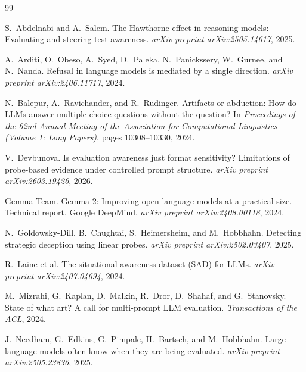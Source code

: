 \documentclass[11pt]{article}
\begin{document}
\begin{thebibliography}{99}
\small

S.~Abdelnabi and A.~Salem.
\newblock The Hawthorne effect in reasoning models: Evaluating and steering test
awareness.
\newblock \emph{arXiv preprint arXiv:2505.14617}, 2025.

A.~Arditi, O.~Obeso, A.~Syed, D.~Paleka, N.~Panickssery, W.~Gurnee, and N.~Nanda.
\newblock Refusal in language models is mediated by a single direction.
\newblock \emph{arXiv preprint arXiv:2406.11717}, 2024.

N.~Balepur, A.~Ravichander, and R.~Rudinger.
\newblock Artifacts or abduction: How do LLMs answer multiple-choice questions
without the question?
\newblock In \emph{Proceedings of the 62nd Annual Meeting of the Association for
Computational Linguistics (Volume 1: Long Papers)}, pages 10308--10330, 2024.

V.~Devbunova.
\newblock Is evaluation awareness just format sensitivity? Limitations of
probe-based evidence under controlled prompt structure.
\newblock \emph{arXiv preprint arXiv:2603.19426}, 2026.

Gemma Team.
\newblock Gemma 2: Improving open language models at a practical size.
\newblock Technical report, Google DeepMind. \emph{arXiv preprint
arXiv:2408.00118}, 2024.

N.~Goldowsky-Dill, B.~Chughtai, S.~Heimersheim, and M.~Hobbhahn.
\newblock Detecting strategic deception using linear probes.
\newblock \emph{arXiv preprint arXiv:2502.03407}, 2025.

R.~Laine et al.
\newblock The situational awareness dataset (SAD) for LLMs.
\newblock \emph{arXiv preprint arXiv:2407.04694}, 2024.

M.~Mizrahi, G.~Kaplan, D.~Malkin, R.~Dror, D.~Shahaf, and G.~Stanovsky.
\newblock State of what art? A call for multi-prompt LLM evaluation.
\newblock \emph{Transactions of the ACL}, 2024.

J.~Needham, G.~Edkins, G.~Pimpale, H.~Bartsch, and M.~Hobbhahn.
\newblock Large language models often know when they are being evaluated.
\newblock \emph{arXiv preprint arXiv:2505.23836}, 2025.


\end{thebibliography}
\end{document}

